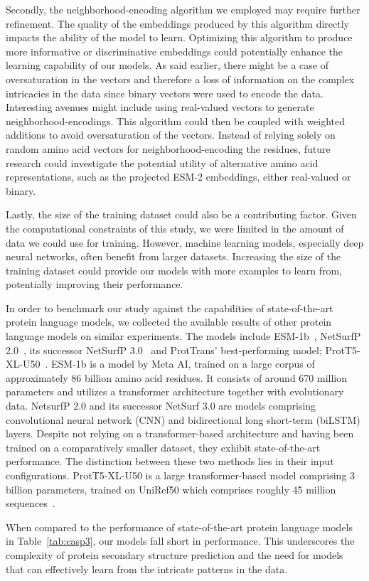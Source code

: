 Secondly, the neighborhood-encoding algorithm we employed may require further refinement. The quality of the embeddings produced by this algorithm directly impacts the ability of the model to learn. Optimizing this algorithm to produce more informative or discriminative embeddings could potentially enhance the learning capability of our models. As said earlier, there might be a case of oversaturation in the vectors and therefore a loss of information on the complex intricacies in the data since binary vectors were used to encode the data. Interesting avenues might include using real-valued vectors to generate neighborhood-encodings. This algorithm could then be coupled with weighted additions to avoid oversaturation of the vectors. Instead of relying solely on random amino acid vectors for neighborhood-encoding the residues, future research could investigate the potential utility of alternative amino acid representations, such as the projected ESM-2 embeddings, either real-valued or binary.

Lastly, the size of the training dataset could also be a contributing factor. Given the computational constraints of this study, we were limited in the amount of data we could use for training. However, machine learning models, especially deep neural networks, often benefit from larger datasets. Increasing the size of the training dataset could provide our models with more examples to learn from, potentially improving their performance.

In order to benchmark our study against the capabilities of state-of-the-art protein language models, we collected the available results of other protein language models on similar experiments. The models include ESM-1b~\cite{esm}, NetSurfP 2.0~\cite{netsurf}, its successor NetSurfP 3.0~\cite{netsurf3} and ProtTrans' best-performing model; ProtT5-XL-U50~\cite{prottrans}. ESM-1b is a model by Meta AI, trained on a large corpus of approximately 86 billion amino acid residues. It consists of around 670 million parameters and utilizes a transformer architecture together with evolutionary data. NetsurfP 2.0 and its successor NetSurf 3.0 are models comprising convolutional neural network (CNN) and bidirectional long short-term (biLSTM) layers. Despite not relying on a transformer-based architecture and having been trained on a comparatively smaller dataset, they exhibit state-of-the-art performance. The distinction between these two methods lies in their input configurations. ProtT5-XL-U50 is a large transformer-based model comprising 3 billion parameters, trained on UniRef50 which comprises roughly 45 million sequences~\cite{uniref}.

When compared to the performance of state-of-the-art protein language models in Table~\ref{tab:casp3}, our models fall short in performance. This underscores the complexity of protein secondary structure prediction and the need for models that can effectively learn from the intricate patterns in the data.
